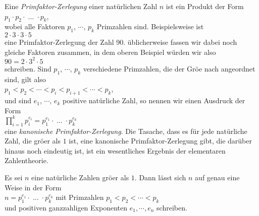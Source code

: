 Eine \emph{Primfaktor-Zerlegung} einer nat\"{u}rlichen Zahl $n$ ist ein Produkt der Form
\\[0.2cm]
\hspace*{1.3cm}
$p_1 \cdot p_2 \cdot\; \dots \;\cdot p_k$,
\\[0.2cm]
wobei alle Faktoren $p_1$, $\cdots$, $p_k$ Primzahlen sind.  Beispielsweise ist
\\[0.2cm]
\hspace*{1.3cm}
$2 \cdot 3 \cdot 3 \cdot 5$
\\[0.2cm]
eine Primfaktor-Zerlegung der Zahl 90.  \"{u}blicherweise fassen wir dabei noch gleiche Faktoren
zusammen, in dem oberen Beispiel w\"{u}rden wir also
\\[0.2cm]
\hspace*{1.3cm}
$90 = 2 \cdot 3^2 \cdot 5$
\\[0.2cm]
schreiben.  Sind $p_1$, $\cdots$, $p_k$ verschiedene Primzahlen, die der Gr\"{o}\3e nach angeordnet sind,
gilt also
\\[0.2cm]
\hspace*{1.3cm}
$p_1 < p_2 < \cdots < p_{i} < p_{i+1} < \cdots < p_k$,
\\[0.2cm]
und sind $e_1$, $\cdots$, $e_k$ positive nat\"{u}rliche Zahl, so nennen wir einen Ausdruck der Form
\\[0.2cm]
\hspace*{1.3cm}
$\prod\limits_{i=1}^k  p_i^{e_i} = p_1^{e_1} \cdot \;\dots\; \cdot p_k^{e_k}$
\\[0.2cm]
eine \emph{kanonische Primfaktor-Zerlegung}.  Die Tasache, dass es f\"{u}r jede nat\"{u}rliche Zahl, die
gr\"{o}\3er als $1$ ist, eine kanonische Primfaktor-Zerlegung gibt, die dar\"{u}ber hinaus noch eindeutig
ist,  ist ein wesentliches Ergebnis der elementaren Zahlentheorie.


\begin{Theorem}
\label{theorem:fundamental-arithmetik} \lb
  Es sei $n$ eine nat\"{u}rliche Zahlen gr\"{o}\3er als $1$.  Dann l\"{a}sst sich $n$ auf genau eine Weise in der Form
  \\[0.2cm]
  \hspace*{1.3cm}
  $n = p_1^{e_1} \cdot \;\dots\; \cdot p_k^{e_k}$ \quad mit Primzahlen $p_1 < p_2 < \cdots < p_k$
  \\[0.2cm]
  und positiven ganzzahligen Exponenten $e_1, \cdots, e_n$ schreiben.
\end{Theorem}

